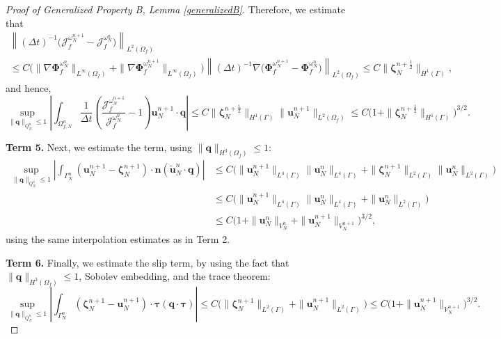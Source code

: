 \documentclass[11pt]{article}
\newcommand{\bd}{\boldsymbol}
\theoremstyle{definition}
\begin{document}
\begin{proof}[Proof of Generalized Property B, Lemma \ref{generalizedB}]
Therefore, we estimate that
\begin{multline*}
\left\|(\Delta t)^{-1}\Big(\mathcal{J}^{\omega^{n + 1}_{N}}_{f} - \mathcal{J}^{\omega^{n}_{N}}_{f}\Big)\right\|_{L^{2}(\Omega_{f})} \\
\le C\Big(\|\nabla \bd{\Phi}^{\omega^{n}_{N}}_{f}\|_{L^{\infty}(\Omega_{f})} + \|\nabla \bd{\Phi}^{\omega^{n + 1}_{N}}_{f}\|_{L^{\infty}(\Omega_{f})}\Big)\left\|(\Delta t)^{-1} \nabla \Big(\bd{\Phi}^{\omega^{n + 1}_{N}}_{f} - \bd{\Phi}^{\omega^{n}_{N}}_{f}\Big)\right\|_{L^{2}(\Omega_{f})} \le C\|\bd{\zeta}^{n + \frac{1}{2}}_{N}\|_{H^{1}(\Gamma)},
\end{multline*}
and hence, 
\begin{equation*}
\sup_{\|\bd{q}\|_{Q^{n}_{N}} \le 1} \left|\int_{\Omega^{n}_{f, N}} \frac{1}{\Delta t} \left(\frac{\mathcal{J}^{\omega^{n + 1}_{N}}_{f}}{\mathcal{J}^{\omega^{n}_{N}}_{f}} - 1\right) \bd{u}^{n + 1}_{N} \cdot \bd{q}\right| \le C\|\bd{\zeta}^{n + \frac{1}{2}}_{N}\|_{H^{1}(\Gamma)} \|\bd{u}^{n + 1}_{N}\|_{L^{2}(\Omega_{f})} \le C\Big(1 + \|\bd{\zeta}^{n + \frac{1}{2}}_{N}\|_{H^{1}(\Gamma)}\Big)^{3/2}.
\end{equation*}

\medskip

\noindent \textbf{Term 5.} Next, we estimate the term, using $\|\bd{q}\|_{H^{3}(\Omega_{f})} \le 1$:
\begin{align*}
\sup_{\|\bd{q}\|_{Q^{n}_{N}} \le 1} \left|\int_{\Gamma^{n}_{N}} (\bd{u}^{n + 1}_{N} - \bd{\zeta}^{n + 1}_{N}) \cdot \bd{n} (\tilde{\bd{u}}^{n}_{N} \cdot \bd{q})\right| &\le C\Big(\|\bd{u}^{n + 1}_{N}\|_{L^{4}(\Gamma)} \|\bd{u}^{n}_{N}\|_{L^{4}(\Gamma)} + \|\bd{\zeta}^{n + 1}_{N}\|_{L^{2}(\Gamma)}\|\bd{u}^{n}_{N}\|_{L^{2}(\Gamma)}\Big) \\
&\le C\Big(\|\bd{u}^{n + 1}_{N}\|_{L^{4}(\Gamma)} \|\bd{u}^{n}_{N}\|_{L^{4}(\Gamma)} + \|\bd{u}^{n}_{N}\|_{L^{2}(\Gamma)}\Big) \\
&\le C\Big(1 + \|\bd{u}^{n}_{N}\|_{V^{n}_{N}} + \|\bd{u}^{n + 1}_{N}\|_{V^{n + 1}_{N}}\Big)^{3/2},
\end{align*}
using the same interpolation estimates as in Term 2.

\medskip

\noindent \textbf{Term 6.} Finally, we estimate the slip term, by using the fact that $\|\bd{q}\|_{H^{3}(\Omega_{f})} \le 1$, Sobolev embedding, and the trace theorem:
\begin{equation*}
\sup_{\|\bd{q}\|_{Q^{n}_{N}} \le 1} \left|\int_{\Gamma^{n}_{N}} (\bd{\zeta}^{n + 1}_{N} - \bd{u}^{n + 1}_{N}) \cdot \bd{\tau} (\bd{q} \cdot \bd{\tau})\right| \le C\Big(\|\bd{\zeta}^{n + 1}_{N}\|_{L^{2}(\Gamma)} + \|\bd{u}^{n + 1}_{N}\|_{L^{2}(\Gamma)}\Big) \le C\Big(1 + \|\bd{u}^{n + 1}_{N}\|_{V^{n + 1}_{N}}\Big)^{3/2}.
\end{equation*}


\end{proof}
\end{document}
